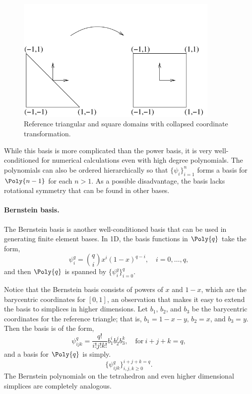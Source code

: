 \begin{figure}
\begin{center}
\includegraphics[height=6cm]{chapters/kirby-1/pdf/tricoord.pdf}
\end{center}
\caption{Reference triangular and square domains with collapsed
  coordinate transformation.}
\label{fig:tricoord}
\end{figure}

While this basis is more complicated than the power basis, it is
very well-conditioned for numerical calculations even with high degree
polynomials.  The polynomials can also be ordered hierarchically so that
$\{ \psi_i \}_{i=1}^{n}$ forms a basis for $\Poly{n-1}$ for each $n >
1$.  As a possible disadvantage, the basis lacks rotational symmetry
that can be found in other bases.

\paragraph{Bernstein basis.}
The Bernstein basis is another well-conditioned basis that can be used
in generating finite element bases.  In 1D, the basis functions in $\Poly{q}$
take the form,
\begin{equation}
\psi_i^q = \binom{q}{i} x^i (1-x)^{q-i}, \quad i=0,\ldots,q,
\end{equation}
and then $\Poly{q}$ is spanned by $\{ \psi_i^q \}_{i=0}^q$.

Notice that the Bernstein basis consists of powers of $x$ and
$1-x$, which are the barycentric coordinates for $[0,1]$,
an observation that makes it easy to extend the basis to simplices
in higher dimensions.  Let $b_1$, $b_2$, and $b_3$ be the barycentric
coordinates for the reference triangle; that is, $b_1=1-x-y$, $b_2=x$,
and $b_3=y$. Then the basis is of the form,
\begin{equation}
\psi_{ijk}^q = \frac{q!}{i!j!k!} b_1^i b_2^j b_3^k, \quad  \mbox{for} \ i+j+k=q,
\end{equation}
and a basis for $\Poly{q}$ is simply.
\begin{equation}
\{ \psi_{ijk}^q \}_{i,j,k\geqslant 0}^{i+j+k = q} .
\end{equation}
The Bernstein polynomials on the tetrahedron and even higher dimensional
simplices are completely analogous.

